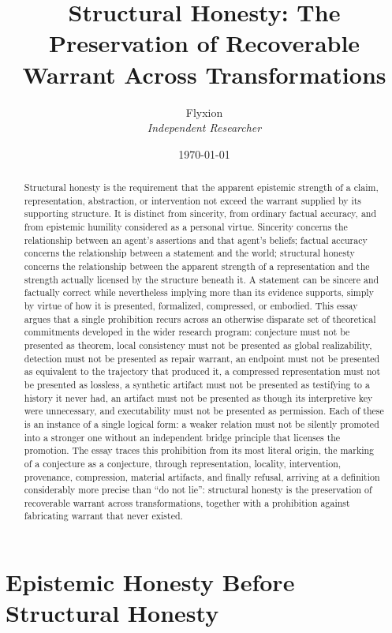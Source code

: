 \documentclass[11pt]{article}
\title{\textbf{Structural Honesty: The Preservation of Recoverable Warrant Across Transformations}}
\author{Flyxion \\ \textit{Independent Researcher}}
\date{\today}
\begin{document}
\maketitle

\begin{abstract}
Structural honesty is the requirement that the apparent epistemic strength of a claim, representation, abstraction, or intervention not exceed the warrant supplied by its supporting structure. It is distinct from sincerity, from ordinary factual accuracy, and from epistemic humility considered as a personal virtue. Sincerity concerns the relationship between an agent's assertions and that agent's beliefs; factual accuracy concerns the relationship between a statement and the world; structural honesty concerns the relationship between the apparent strength of a representation and the strength actually licensed by the structure beneath it. A statement can be sincere and factually correct while nevertheless implying more than its evidence supports, simply by virtue of how it is presented, formalized, compressed, or embodied. This essay argues that a single prohibition recurs across an otherwise disparate set of theoretical commitments developed in the wider research program: conjecture must not be presented as theorem, local consistency must not be presented as global realizability, detection must not be presented as repair warrant, an endpoint must not be presented as equivalent to the trajectory that produced it, a compressed representation must not be presented as lossless, a synthetic artifact must not be presented as testifying to a history it never had, an artifact must not be presented as though its interpretive key were unnecessary, and executability must not be presented as permission. Each of these is an instance of a single logical form: a weaker relation must not be silently promoted into a stronger one without an independent bridge principle that licenses the promotion. The essay traces this prohibition from its most literal origin, the marking of a conjecture as a conjecture, through representation, locality, intervention, provenance, compression, material artifacts, and finally refusal, arriving at a definition considerably more precise than ``do not lie'': structural honesty is the preservation of recoverable warrant across transformations, together with a prohibition against fabricating warrant that never existed.
\end{abstract}

\newpage

\section{Epistemic Honesty Before Structural Honesty}
\end{document}
